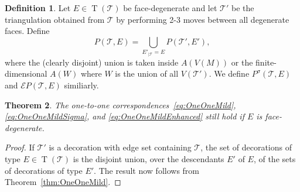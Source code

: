 \documentclass[11pt]{amsart}
\theoremstyle{plain}
\newtheorem{theorem}{Theorem}[section]
\theoremstyle{definition}
\newtheorem{definition}[theorem]{Definition}
\newtheorem{remark}[theorem]{Remark}
\numberwithin{equation}{section}
\newcommand{\T}{\mathcal T}
\newcommand{\E}{\mathcal E}
\DeclareMathOperator{\TE}{T}
\begin{document}
\begin{definition}\label{def:PtolemyModerate} Let $E\in \TE(\T)$ be face-degenerate and let $\T'$ be the triangulation obtained from $\T$ by performing 2-3 moves between all degenerate faces. Define
\begin{equation}\label{eq:PtolemyVarietyModerate}
P(\T,E)=\bigcup_{E'_{|\T}=E}P(\T',E'),
\end{equation}
where the (clearly disjoint) union is taken inside $A(V(M))$ or the finite-dimensional $A(W)$ where $W$ is the union of all $V(\T')$. We define $P^\sigma(\T,E)$ and $\E P(\T,E)$ similiarly.
\end{definition}






\begin{theorem}\label{thm:OneOneModerate}
The one-to-one correspondences~\eqref{eq:OneOneMild}, \eqref{eq:OneOneMildSigma}, and \eqref{eq:OneOneMildEnhanced} still hold if $E$ is face-degenerate. 
\end{theorem}
\begin{proof}
If $\T'$ is a decoration with edge set containing $\T$, the set of decorations of type $E\in\TE(\T)$ is the disjoint union, over the descendants $E'$ of $E$, of the sets of decorations of type $E'$. The result now follows from Theorem~\ref{thm:OneOneMild}.
\end{proof}
\end{document}

